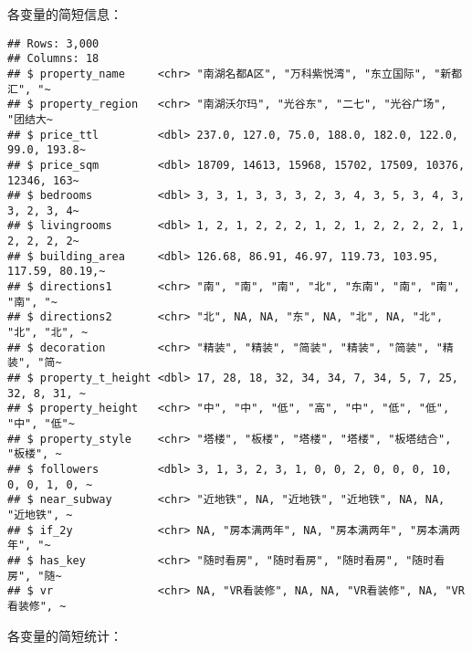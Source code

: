 \documentclass[
]{article}
\begin{document}
各变量的简短信息：

\begin{verbatim}
## Rows: 3,000
## Columns: 18
## $ property_name     <chr> "南湖名都A区", "万科紫悦湾", "东立国际", "新都汇", "~
## $ property_region   <chr> "南湖沃尔玛", "光谷东", "二七", "光谷广场", "团结大~
## $ price_ttl         <dbl> 237.0, 127.0, 75.0, 188.0, 182.0, 122.0, 99.0, 193.8~
## $ price_sqm         <dbl> 18709, 14613, 15968, 15702, 17509, 10376, 12346, 163~
## $ bedrooms          <dbl> 3, 3, 1, 3, 3, 3, 2, 3, 4, 3, 5, 3, 4, 3, 3, 2, 3, 4~
## $ livingrooms       <dbl> 1, 2, 1, 2, 2, 2, 1, 2, 1, 2, 2, 2, 2, 1, 2, 2, 2, 2~
## $ building_area     <dbl> 126.68, 86.91, 46.97, 119.73, 103.95, 117.59, 80.19,~
## $ directions1       <chr> "南", "南", "南", "北", "东南", "南", "南", "南", "~
## $ directions2       <chr> "北", NA, NA, "东", NA, "北", NA, "北", "北", "北", ~
## $ decoration        <chr> "精装", "精装", "简装", "精装", "简装", "精装", "简~
## $ property_t_height <dbl> 17, 28, 18, 32, 34, 34, 7, 34, 5, 7, 25, 32, 8, 31, ~
## $ property_height   <chr> "中", "中", "低", "高", "中", "低", "低", "中", "低"~
## $ property_style    <chr> "塔楼", "板楼", "塔楼", "塔楼", "板塔结合", "板楼", ~
## $ followers         <dbl> 3, 1, 3, 2, 3, 1, 0, 0, 2, 0, 0, 0, 10, 0, 0, 1, 0, ~
## $ near_subway       <chr> "近地铁", NA, "近地铁", "近地铁", NA, NA, "近地铁", ~
## $ if_2y             <chr> NA, "房本满两年", NA, "房本满两年", "房本满两年", "~
## $ has_key           <chr> "随时看房", "随时看房", "随时看房", "随时看房", "随~
## $ vr                <chr> NA, "VR看装修", NA, NA, "VR看装修", NA, "VR看装修", ~
\end{verbatim}

各变量的简短统计：
\end{document}
